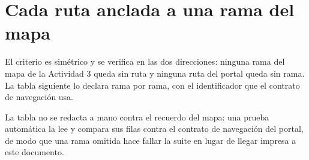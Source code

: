 \section{Cada ruta anclada a una rama del mapa}

El criterio es simétrico y se verifica en las dos direcciones: ninguna rama del mapa de la Actividad
3 queda sin ruta y ninguna ruta del portal queda sin rama. La tabla siguiente lo declara rama por
rama, con el identificador que el contrato de navegación usa.

La tabla no se redacta a mano contra el recuerdo del mapa: una prueba automática la lee y compara
sus filas contra el contrato de navegación del portal, de modo que una rama omitida hace fallar la
suite en lugar de llegar impresa a este documento.

